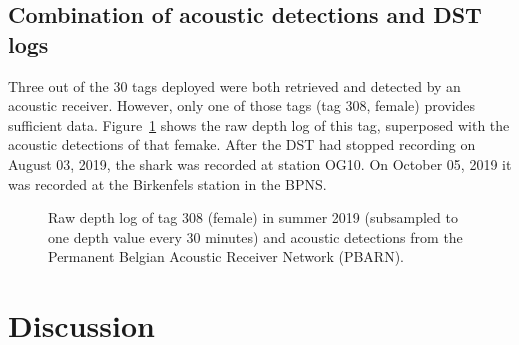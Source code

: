 \documentclass[
  authoryear,
  review,
  3p]{elsarticle}
\begin{document}
\newpage{}

\hypertarget{combination-of-acoustic-detections-and-dst-logs}{%
\subsection{Combination of acoustic detections and DST
logs}\label{combination-of-acoustic-detections-and-dst-logs}}

Three out of the 30 tags deployed were both retrieved and detected by an
acoustic receiver. However, only one of those tags (tag 308, female)
provides sufficient data. Figure~\ref{fig-adst308} shows the raw depth
log of this tag, superposed with the acoustic detections of that femake.
After the DST had stopped recording on August 03, 2019, the shark was
recorded at station OG10. On October 05, 2019 it was recorded at the
Birkenfels station in the BPNS.

\begin{figure}

\begin{minipage}[t]{\linewidth}

{\centering 


\caption{\label{fig-adst308}Raw depth log of tag 308 (female) in summer
2019 (subsampled to one depth value every 30 minutes) and acoustic
detections from the Permanent Belgian Acoustic Receiver Network
(PBARN).}

}

\end{minipage}%

\end{figure}

\hypertarget{sec-disc}{%
\section{Discussion}\label{sec-disc}}
\end{document}
